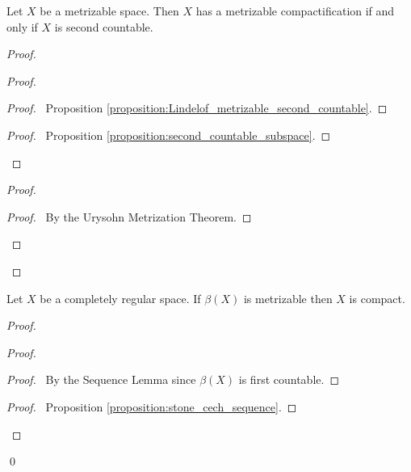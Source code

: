 \begin{proposition}
    Let $X$ be a metrizable space. Then $X$ has a metrizable compactification if and only if $X$ is second countable.
\end{proposition}

\begin{proof}
    \pf
    \begin{proof}
        \begin{proof}
            \pf\ Proposition \ref{proposition:Lindelof_metrizable_second_countable}.
        \end{proof}
        \begin{proof}
            \pf\ Proposition \ref{proposition:second_countable_subspace}.
        \end{proof}
    \end{proof}
    \begin{proof}
        \begin{proof}
            \pf\ By the Urysohn Metrization Theorem.
        \end{proof}
    \end{proof}
\end{proof}

\begin{proposition}
    Let $X$ be a completely regular space. If $\beta(X)$ is metrizable then $X$ is compact.
\end{proposition}

\begin{proof}
    \pf
    \begin{proof}
        \begin{proof}
            \pf\ By the Sequence Lemma since $\beta(X)$ is first countable.
        \end{proof}
        \begin{proof}
            \pf\ Proposition \ref{proposition:stone_cech_sequence}.
        \end{proof}
    \end{proof}
    \qed
\end{proof}

